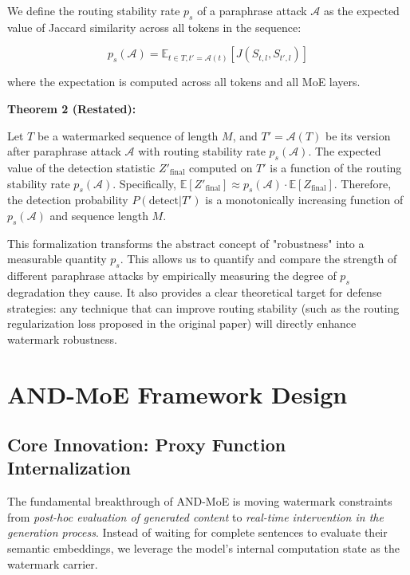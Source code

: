 \documentclass[letterpaper,twocolumn,10pt]{article}
\begin{document}
We define the routing stability rate $p_s$ of a paraphrase attack $\mathcal{A}$ as the expected value of Jaccard similarity across all tokens in the sequence:

\begin{equation}
p_s(\mathcal{A}) = \mathbb{E}_{t \in T, t'=\mathcal{A}(t)} [J(S_{t,l}, S_{t',l})]
\end{equation}

where the expectation is computed across all tokens and all MoE layers.

\textbf{Theorem 2 (Restated):}

Let $T$ be a watermarked sequence of length $M$, and $T' = \mathcal{A}(T)$ be its version after paraphrase attack $\mathcal{A}$ with routing stability rate $p_s(\mathcal{A})$. The expected value of the detection statistic $Z'_{\text{final}}$ computed on $T'$ is a function of the routing stability rate $p_s(\mathcal{A})$. Specifically, $\mathbb{E}[Z'_{\text{final}}] \approx p_s(\mathcal{A}) \cdot \mathbb{E}[Z_{\text{final}}]$. Therefore, the detection probability $P(\text{detect}|T')$ is a monotonically increasing function of $p_s(\mathcal{A})$ and sequence length $M$.

This formalization transforms the abstract concept of "robustness" into a measurable quantity $p_s$. This allows us to quantify and compare the strength of different paraphrase attacks by empirically measuring the degree of $p_s$ degradation they cause. It also provides a clear theoretical target for defense strategies: any technique that can improve routing stability (such as the routing regularization loss proposed in the original paper) will directly enhance watermark robustness.

\section{AND-MoE Framework Design}

\subsection{Core Innovation: Proxy Function Internalization}

The fundamental breakthrough of AND-MoE is moving watermark constraints from \textit{post-hoc evaluation of generated content} to \textit{real-time intervention in the generation process}. Instead of waiting for complete sentences to evaluate their semantic embeddings, we leverage the model's internal computation state as the watermark carrier.
\end{document}

